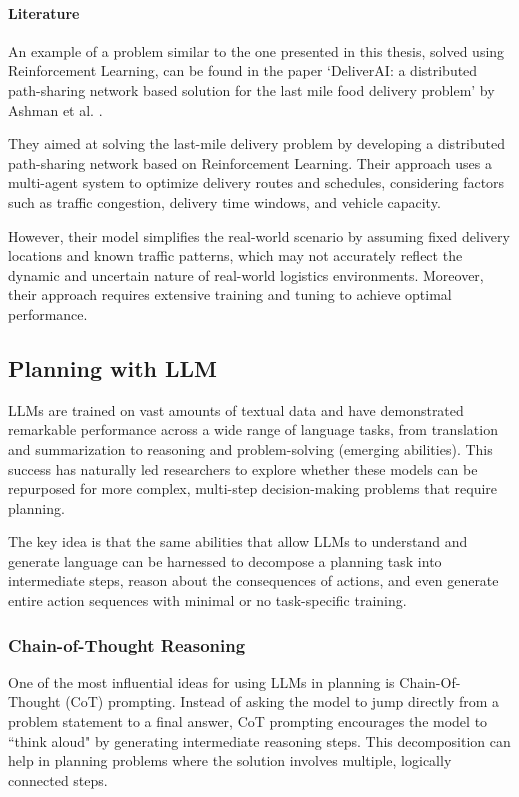 \paragraph{Literature}
An example of a problem similar to the one presented in this thesis, solved using
Reinforcement Learning, can be found in the paper `DeliverAI: a distributed path-sharing
network based solution for the last mile food delivery problem' by Ashman et al.
\cite{mehra2024deliveraireinforcementlearningbased}.

They aimed at solving the last-mile delivery problem by developing a distributed
path-sharing network based on Reinforcement Learning. Their approach uses a multi-agent
system to optimize delivery routes and schedules, considering factors such as
traffic congestion, delivery time windows, and vehicle capacity.

However, their model simplifies the real-world scenario by assuming fixed delivery
locations and known traffic patterns, which may not accurately reflect the
dynamic and uncertain nature of real-world logistics environments. Moreover,
their approach requires extensive training and tuning to achieve optimal
performance.

\subsection{Planning with LLM}
\label{sub:planning_in_llm}

LLMs are trained on vast amounts of textual data and have demonstrated remarkable
performance across a wide range of language tasks, from translation and
summarization to reasoning and problem-solving (emerging abilities). This success
has naturally led researchers to explore whether these models can be repurposed for
more complex, multi-step decision-making problems that require planning.

The key idea is that the same abilities that allow LLMs to understand and
generate language can be harnessed to decompose a planning task into
intermediate steps, reason about the consequences of actions, and even generate
entire action sequences with minimal or no task-specific training.

\subsubsection{Chain-of-Thought Reasoning}

One of the most influential ideas for using LLMs in planning is Chain-Of-Thought
(CoT) prompting. Instead of asking the model to jump directly from a problem
statement to a final answer, CoT prompting encourages the model to ``think aloud"
by generating intermediate reasoning steps. This decomposition can help in planning
problems where the solution involves multiple, logically connected steps.

